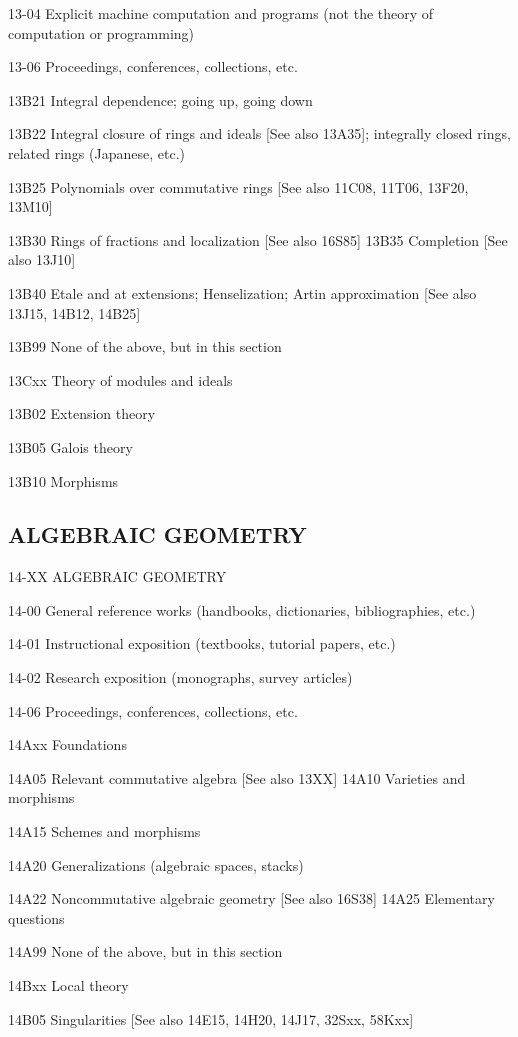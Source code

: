 \documentclass[12pt]{article}
\theoremstyle{plain}
\theoremstyle{definition}
\numberwithin{equation}{section}
\begin{document}
{13-04 Explicit machine computation and programs (not the theory of computation or programming)

13-06 Proceedings, conferences, collections, etc.

13B21 Integral dependence; going up, going down

13B22 Integral closure of rings and ideals [See also 13A35]; integrally closed rings, related rings (Japanese, etc.)

13B25 Polynomials over commutative rings [See also 11C08, 11T06, 13F20, 13M10]

13B30 Rings of fractions and localization [See also 16S85] 13B35 Completion [See also 13J10]

13B40 Etale and at extensions; Henselization; Artin approximation [See also 13J15, 14B12, 14B25]

13B99 None of the above, but in this section

13Cxx Theory of modules and ideals

13B02 Extension theory

13B05 Galois theory

13B10 Morphisms


\subsection{ALGEBRAIC GEOMETRY}

14-XX ALGEBRAIC GEOMETRY

14-00 General reference works (handbooks, dictionaries, bibliographies, etc.)

14-01 Instructional exposition (textbooks, tutorial papers, etc.)

14-02 Research exposition (monographs, survey articles)

14-06 Proceedings, conferences, collections, etc.

14Axx Foundations

14A05 Relevant commutative algebra [See also 13XX] 14A10 Varieties and morphisms

14A15 Schemes and morphisms

14A20 Generalizations (algebraic spaces, stacks)

14A22 Noncommutative algebraic geometry [See also 16S38] 14A25 Elementary questions

14A99 None of the above, but in this section

14Bxx Local theory

14B05 Singularities [See also 14E15, 14H20, 14J17, 32Sxx, 58Kxx]

}
\end{document}
